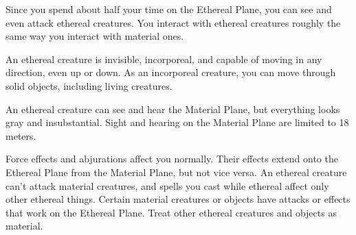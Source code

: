 {	Since you spend about half your time on the Ethereal Plane, you can see and even attack ethereal creatures. You interact with ethereal creatures roughly the same way you interact with material ones.

	An ethereal creature is invisible, incorporeal, and capable of moving in any direction, even up or down. As an incorporeal creature, you can move through solid objects, including living creatures.

	An ethereal creature can see and hear the Material Plane, but everything looks gray and insubstantial. Sight and hearing on the Material Plane are limited to 18 meters.

	Force effects and abjurations affect you normally. Their effects extend onto the Ethereal Plane from the Material Plane, but not vice versa. An ethereal creature can't attack material creatures, and spells you cast while ethereal affect only other ethereal things. Certain material creatures or objects have attacks or effects that work on the Ethereal Plane. Treat other ethereal creatures and objects as material.

}
